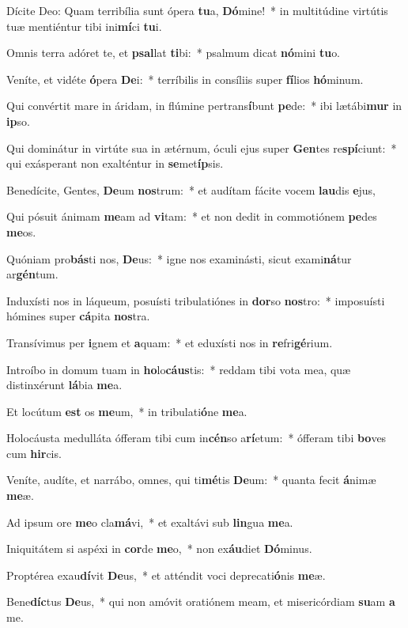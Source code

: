 \item Dícite Deo: Quam terribília sunt ópera \textbf{tu}a, \textbf{Dó}mine!~* in multitúdine virtútis tuæ mentiéntur tibi ini\textbf{mí}ci \textbf{tu}i.
\item Omnis terra adóret te, et \textbf{psal}lat \textbf{ti}bi:~* psalmum dicat \textbf{nó}mini \textbf{tu}o.
\item Veníte, et vidéte \textbf{ó}pera \textbf{De}i:~* terríbilis in consíliis super \textbf{fí}lios \textbf{hó}minum.
\item Qui convértit mare in áridam, in flúmine pertrans\textbf{í}bunt \textbf{pe}de:~* ibi lætábi\textbf{mur} in \textbf{ip}so.
\item Qui dominátur in virtúte sua in ætérnum, óculi ejus super \textbf{Gen}tes re\textbf{spí}ciunt:~* qui exásperant non exalténtur in \textbf{se}met\textbf{íp}sis.
\item Benedícite, Gentes, \textbf{De}um \textbf{nos}trum:~* et audítam fácite vocem \textbf{lau}dis \textbf{e}jus,
\item Qui pósuit ánimam \textbf{me}am ad \textbf{vi}tam:~* et non dedit in commotiónem \textbf{pe}des \textbf{me}os.
\item Quóniam pro\textbf{bás}ti nos, \textbf{De}us:~* igne nos examinásti, sicut exami\textbf{ná}tur ar\textbf{gén}tum.
\item Induxísti nos in láqueum, posuísti tribulatiónes in \textbf{dor}so \textbf{nos}tro:~* imposuísti hómines super \textbf{cá}pita \textbf{nos}tra.
\item Transívimus per \textbf{i}gnem et \textbf{a}quam:~* et eduxísti nos in \textbf{re}fri\textbf{gé}rium.
\item Introíbo in domum tuam in \textbf{ho}lo\textbf{cáus}tis:~* reddam tibi vota mea, quæ distinxérunt \textbf{lá}bia \textbf{me}a.
\item Et locútum \textbf{est} os \textbf{me}um,~* in tribulati\textbf{ó}ne \textbf{me}a.
\item Holocáusta medulláta ófferam tibi cum in\textbf{cén}so a\textbf{rí}etum:~* ófferam tibi \textbf{bo}ves cum \textbf{hir}cis.
\item Veníte, audíte, et narrábo, omnes, qui ti\textbf{mé}tis \textbf{De}um:~* quanta fecit \textbf{á}nimæ \textbf{me}æ.
\item Ad ipsum ore \textbf{me}o cla\textbf{má}vi,~* et exaltávi sub \textbf{lin}gua \textbf{me}a.
\item Iniquitátem si aspéxi in \textbf{cor}de \textbf{me}o,~* non ex\textbf{áu}diet \textbf{Dó}minus.
\item Proptérea exau\textbf{dí}vit \textbf{De}us,~* et atténdit voci deprecati\textbf{ó}nis \textbf{me}æ.
\item Bene\textbf{díc}tus \textbf{De}us,~* qui non amóvit oratiónem meam, et misericórdiam \textbf{su}am \textbf{a} me.
